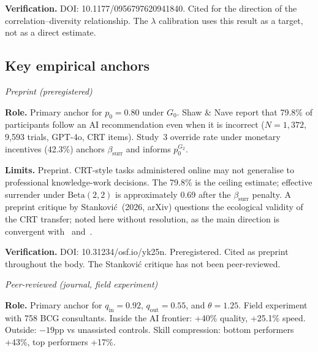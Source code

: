 \documentclass[11pt,a4paper]{article}
\begin{document}
\begin{appendices}
\begin{description}[style=nextline, leftmargin=0pt, labelindent=0pt]
\textbf{Verification.}
DOI: 10.1177/0956797620941840. Cited for the direction of the
correlation--diversity relationship. The $\lambda$ calibration uses this
result as a target, not as a direct estimate.

\end{description}

\subsection{Key empirical anchors}\label{app:bib:empirical}

\begin{description}[style=nextline, leftmargin=0pt, labelindent=0pt]

\item[\cite{shaw_psyarxiv_2026} --- Shaw \& Nave (2026), PsyArXiv.]
\hfill\textit{Preprint (preregistered)}

\textbf{Role.}
Primary anchor for $p_0 = 0.80$ under $G_0$. Shaw \& Nave report that
79.8\% of participants follow an AI recommendation even when it is incorrect
($N = 1{,}372$, 9,593 trials, GPT-4o, CRT items). Study~3 override rate
under monetary incentives (42.3\%) anchors $\beta_{\text{surr}}$ and
informs $p_0^{G_2}$.

\textbf{Limits.}
Preprint. CRT-style tasks administered online may not generalise to
professional knowledge-work decisions. The 79.8\% is the ceiling estimate;
effective surrender under $\mathrm{Beta}(2,2)$ is approximately 0.69 after
the $\beta_{\text{surr}}$ penalty. A preprint critique by
Stankovi\'{c}~(2026, arXiv) questions the ecological validity of the CRT
transfer; noted here without resolution, as the main direction is convergent
with~\cite{parasuraman_humafact_2010}
and~\cite{logg_obhdp_2019}.

\textbf{Verification.}
DOI: 10.31234/osf.io/yk25n. Preregistered. Cited as preprint throughout the
body. The Stankovi\'{c} critique has not been peer-reviewed.

\item[\cite{dellacqua_orgscience_2026} --- Dell'Acqua et al.\
(2026), Organization Science.]
\hfill\textit{Peer-reviewed (journal, field experiment)}

\textbf{Role.}
Primary anchor for $q_{\text{in}} = 0.92$, $q_{\text{out}} = 0.55$, and
$\theta = 1.25$. Field experiment with 758 BCG consultants. Inside the AI
frontier: +40\% quality, +25.1\% speed. Outside: $-19$pp vs unassisted
controls. Skill compression: bottom performers +43\%, top performers +17\%.


\end{description}
\end{appendices}
\end{document}
